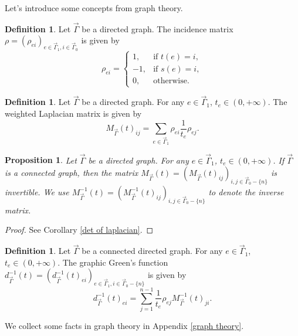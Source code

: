 \documentclass[11pt]{amsart}
\newtheorem{prop}[thm]{Proposition}
\theoremstyle{definition}
\newtheorem{defn}[thm]{Definition}
\theoremstyle{remark}
\numberwithin{equation}{section}
\begin{document}
Let's introduce some concepts from graph theory.
\begin{defn}
    Let $\vec{\Gamma}$ be a directed graph. The incidence matrix $\rho=(\rho_{ei})_{e\in\vec{\Gamma}_{1},i\in\vec{\Gamma}_{0}}$ is given by
    $$
    \rho_{ei}=
    \begin{cases}
        1, &\text{if }t(e)=i,\\
        -1, &\text{if }s(e)=i,\\
        0, &\text{otherwise.}
    \end{cases}
    $$
\end{defn}
\begin{defn}
    Let $\vec{\Gamma}$ be a directed graph. For any $e\in\vec{\Gamma}_{1}$, $t_{e}\in(0,+\infty)$. The weighted Laplacian matrix is given by
    $$
    M_{\vec{\Gamma}}(t)_{ij}=
    \sum_{e\in\vec{\Gamma}_{1}}\rho_{ei}\frac{1}{t_{e}}\rho_{ej}.
    $$
\end{defn}
\begin{prop}\label{Minverse}
    Let $\vec{\Gamma}$ be a directed graph. For any $e\in\vec{\Gamma}_{1}$, $t_e\in(0,+\infty)$. If $\vec{\Gamma}$ is a connected graph, then the matrix $M_{\vec{\Gamma}}(t)=(M_{\vec{\Gamma}}(t)_{ij})_{i,j\in\vec{\Gamma}_{0}-\{n\}}$ is invertible. We use $M^{-1}_{\vec{\Gamma}}(t)=(M^{-1}_{\vec{\Gamma}}(t)_{ij})_{i,j\in\vec{\Gamma}_{0}-\{n\}}$ to denote the inverse matrix.
\end{prop}
\begin{proof}
    See Corollary \ref{det of laplacian}.
\end{proof}
\begin{defn}
    Let $\vec{\Gamma}$ be a connected directed graph. For any $e\in\vec{\Gamma}_{1}$, $t_e\in(0,+\infty)$. The graphic Green's function $d^{-1}_{\vec{\Gamma}}(t)=(d^{-1}_{\vec{\Gamma}}(t)_{ei})_{e\in\vec{\Gamma}_{1},i\in\vec{\Gamma}_{0}-\{n\}}$ is given by
    $$
    d^{-1}_{\vec{\Gamma}}(t)_{ei}=\sum_{j=1}^{n-1}\frac{1}{t_{e}}\rho_{ej}M^{-1}_{\vec{\Gamma}}(t)_{ji}.
    $$
\end{defn}

We collect some facts in graph theory in Appendix \ref{graph theory}.
\end{document}
